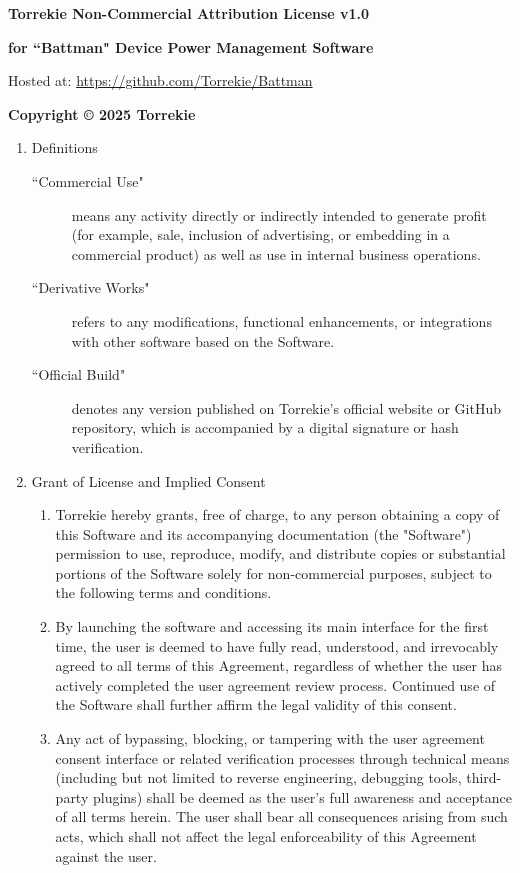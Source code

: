 \documentclass{article}
\begin{document}
{\LARGE\textbf{Torrekie Non-Commercial Attribution License v1.0}}

\Large\textbf{for ``Battman" \textemdash{} Device Power Management Software}

Hosted at: \url{https://github.com/Torrekie/Battman}

\textbf{Copyright \copyright{} 2025 Torrekie}
\renewcommand{\labelenumii}{\arabic{enumi}.\arabic{enumii}}
\begin{enumerate}
	\item Definitions
	\begin{description}
		\item[``Commercial Use"] means any activity directly or indirectly intended to generate profit (for example, sale, inclusion of advertising, or embedding in a commercial product) as well as use in internal business operations.
		\item[``Derivative Works"] refers to any modifications, functional enhancements, or integrations with other software based on the Software.
		\item[``Official Build"] denotes any version published on Torrekie’s official website or GitHub repository, which is accompanied by a digital signature or hash verification.
	\end{description}
	\item Grant of License and Implied Consent
	\begin{enumerate}
		\item Torrekie hereby grants, free of charge, to any person obtaining a copy of this Software and its accompanying documentation (the "Software") permission to use, reproduce, modify, and distribute copies or substantial portions of the Software solely for non-commercial purposes, subject to the following terms and conditions.
		\item By launching the software and accessing its main interface for the first time, the user is deemed to have fully read, understood, and irrevocably agreed to all terms of this Agreement, regardless of whether the user has actively completed the user agreement review process. Continued use of the Software shall further affirm the legal validity of this consent.
		\item Any act of bypassing, blocking, or tampering with the user agreement consent interface or related verification processes through technical means (including but not limited to reverse engineering, debugging tools, third-party plugins) shall be deemed as the user’s full awareness and acceptance of all terms herein. The user shall bear all consequences arising from such acts, which shall not affect the legal enforceability of this Agreement against the user.

\end{enumerate}
\end{enumerate}
\end{document}
